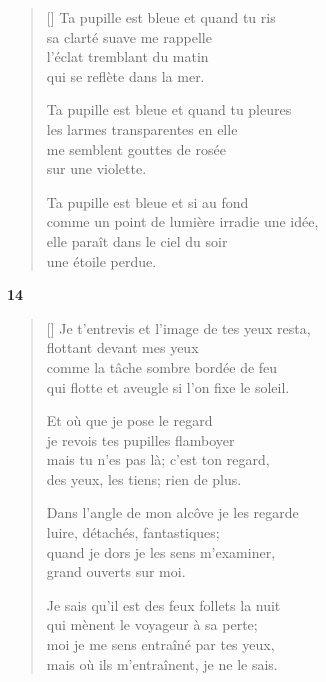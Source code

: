 \documentclass[a4paper,12pt]{book}
\begin{document}
\begin{verse}[\versewidth]
  Ta pupille est bleue et quand tu ris \\
  sa clarté suave me rappelle \\
  l'éclat tremblant du matin \\
  qui se reflète dans la mer.

  Ta pupille est bleue et quand tu pleures \\
  les larmes transparentes en elle \\
  me semblent gouttes de rosée \\
  sur une violette.

  Ta pupille est bleue et si au fond \\
  comme un point de lumière irradie une idée, \\
  elle paraît dans le ciel du soir \\
  une étoile perdue.
\end{verse}

\bigskip

\begin{center}
  \textbf{14}
\end{center}

\settowidth{\versewidth}{Je sais qu'il est des feux follets la nuit}

\begin{verse}[\versewidth]
  Je t'entrevis et l'image de tes yeux resta, \\
  flottant devant mes yeux \\
  comme la tâche sombre bordée de feu \\
  qui flotte et aveugle si l'on fixe le soleil.

  Et où que je pose le regard \\
  je revois tes pupilles flamboyer \\
  mais tu n'es pas là; c'est ton regard, \\
  des yeux, les tiens; rien de plus.

  Dans l'angle de mon alcôve je les regarde \\
  luire, détachés, fantastiques; \\
  quand je dors je les sens m'examiner, \\
  grand ouverts sur moi.

  Je sais qu'il est des feux follets la nuit \\
  qui mènent le voyageur à sa perte; \\
  moi je me sens entraîné par tes yeux, \\
  mais où ils m'entraînent, je ne le sais.
\end{verse}
\end{document}
